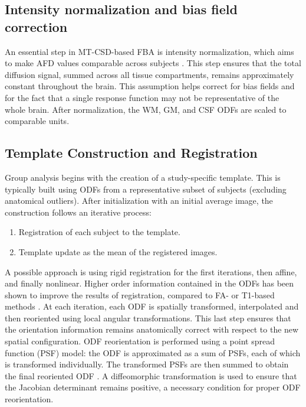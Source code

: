 \subsection{Intensity normalization and bias field correction}
An essential step in MT-CSD-based FBA is intensity normalization, which aims to make AFD values comparable across subjects \cite{Raffelt17}. This step ensures that the total diffusion signal, summed across all tissue compartments, remains approximately constant throughout the brain. This assumption helps correct for bias fields and for the fact that a single response function may not be representative of the whole brain. After normalization, the WM, GM, and CSF ODFs are scaled to comparable units.

\subsection{Template Construction and Registration}
Group analysis begins with the creation of a study-specific template. This is typically built using ODFs from a representative subset of subjects (excluding anatomical outliers). After initialization with an initial average image, the construction follows an iterative process:

\begin{enumerate}
    \item Registration of each subject to the template.
    \item Template update as the mean of the registered images.
\end{enumerate}

A possible approach is using rigid registration for the first iterations, then affine, and finally nonlinear.
Higher order information contained in the ODFs has been shown to improve the results of registration, compared to FA- or T1-based methods \cite{Raffelt2011}. At each iteration, each ODF is spatially transformed, interpolated and then reoriented using local angular transformations. This last step ensures that the orientation information remains anatomically correct with respect to the new spatial configuration.
ODF reorientation is performed using a point spread function (PSF) model: the ODF is approximated as a sum of PSFs, each of which is transformed individually. The transformed PSFs are then summed to obtain the final reoriented ODF \cite{Raffelt12}. A diffeomorphic transformation is used to ensure that the Jacobian determinant remains positive, a necessary condition for proper ODF reorientation.

